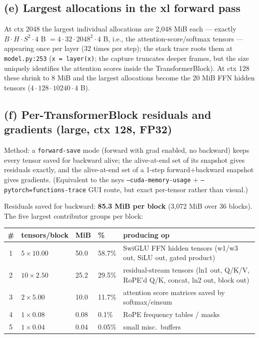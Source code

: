 \documentclass[11pt]{article}
\newcommand{\code}[1]{\texttt{#1}}
\begin{document}
\subsection{(e) Largest allocations in the xl forward pass}

At ctx 2048 the largest individual allocations are 2,048 MiB each --- exactly $B\cdot H\cdot S^2\cdot
4$ B $= 4\cdot32\cdot2048^2\cdot4$ B, i.e., the attention-score/softmax tensors --- appearing once
per layer (32 times per step); the stack trace roots them at \code{model.py:253} (\code{x = layer(x)};
the capture truncates deeper frames, but the size uniquely identifies the attention scores inside the
TransformerBlock). At ctx 128 these shrink to 8 MiB and the largest allocations become the 20 MiB FFN
hidden tensors ($4\cdot128\cdot10240\cdot4$ B).

\subsection{(f) Per-TransformerBlock residuals and gradients (large, ctx 128, FP32)}

Method: a \code{forward-save} mode (forward with grad enabled, no backward) keeps every tensor saved
for backward alive; the alive-at-end set of its snapshot gives residuals exactly, and the
alive-at-end set of a 1-step forward+backward snapshot gives gradients. (Equivalent to the nsys
\code{--cuda-memory-usage} + \code{--pytorch=functions-trace} GUI route, but exact per-tensor rather
than visual.)

Residuals saved for backward: \textbf{85.3 MiB per block} (3,072 MiB over 36 blocks). The five
largest contributor groups per block:

\begin{center}\small
\begin{tabular}{cllll}
\toprule
\# & tensors/block & MiB & \% & producing op \\
\midrule
1 & $5 \times 10.00$ & 50.0 & 58.7\% & SwiGLU FFN hidden tensors (w1/w3 out, SiLU out, gated product) \\
2 & $10 \times 2.50$ & 25.2 & 29.5\% & residual-stream tensors (ln1 out, Q/K/V, RoPE'd Q/K, concat, ln2 out, block out) \\
3 & $2 \times 5.00$  & 10.0 & 11.7\% & attention score matrices saved by softmax/einsum \\
4 & $1 \times 0.08$  & 0.08 & 0.1\% & RoPE frequency tables / masks \\
5 & $1 \times 0.04$  & 0.04 & 0.05\% & small misc.\ buffers \\
\bottomrule
\end{tabular}
\end{center}
\end{document}

